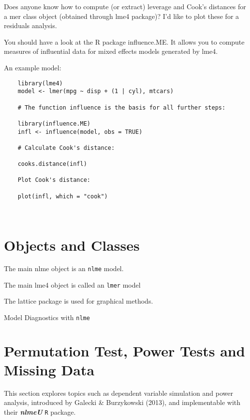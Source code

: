 Does anyone know how to compute (or extract) leverage and Cook's distances for a mer class object (obtained through lme4 package)? I'd like to plot these for a residuals analysis.

You should have a look at the R package influence.ME. It allows you to compute measures of influential data for mixed effects models generated by lme4.

An example model:

\begin{framed}
	\begin{verbatim}
	library(lme4)
	model <- lmer(mpg ~ disp + (1 | cyl), mtcars)
	
	# The function influence is the basis for all further steps:
	
	library(influence.ME)
	infl <- influence(model, obs = TRUE)
	
	# Calculate Cook's distance:
	
	cooks.distance(infl)
	
	Plot Cook's distance:
	
	plot(infl, which = "cook")
	
	
	\end{verbatim}
\end{framed}

\section*{Objects and Classes}

The main nlme object is an \texttt{nlme} model.

The main lme4 object is called an \texttt{lmer} model

The lattice package is used for graphical methods.


Model Diagnostics with \texttt{nlme}

\section*{Permutation Test, Power Tests and Missing Data }

This section explores topics such as dependent variable simulation and power analysis, introduced by Galecki \& Burzykowski (2013), and implementable with their \textbf{\textit{nlmeU}} \texttt{R} package.

